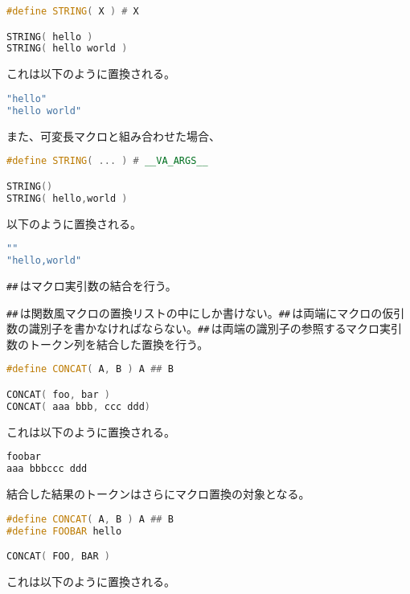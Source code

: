 \begin{lstlisting}[language={C++}]
#define STRING( X ) # X

STRING( hello )
STRING( hello world )
\end{lstlisting}

これは以下のように置換される。

\begin{lstlisting}[language={C++}]
"hello"
"hello world"
\end{lstlisting}

また、可変長マクロと組み合わせた場合、

\begin{lstlisting}[language={C++}]
#define STRING( ... ) # __VA_ARGS__

STRING()
STRING( hello,world )
\end{lstlisting}

以下のように置換される。

\begin{lstlisting}[language={C++}]
""
"hello,world"
\end{lstlisting}


\texttt{\#\#}\,はマクロ実引数の結合を行う。

\texttt{\#\#}\,は関数風マクロの置換リストの中にしか書けない。\texttt{\#\#}\,は両端にマクロの仮引数の識別子を書かなければならない。\texttt{\#\#}\,は両端の識別子の参照するマクロ実引数のトークン列を結合した置換を行う。

\begin{lstlisting}[language={C++}]
#define CONCAT( A, B ) A ## B

CONCAT( foo, bar )
CONCAT( aaa bbb, ccc ddd)
\end{lstlisting}

これは以下のように置換される。

\begin{lstlisting}[language={C++}]
foobar
aaa bbbccc ddd
\end{lstlisting}

結合した結果のトークンはさらにマクロ置換の対象となる。

\begin{lstlisting}[language={C++}]
#define CONCAT( A, B ) A ## B
#define FOOBAR hello

CONCAT( FOO, BAR )
\end{lstlisting}

これは以下のように置換される。

